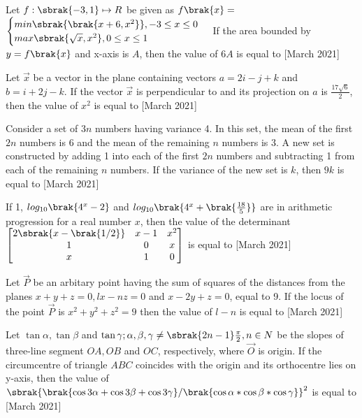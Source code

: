 \item Let $f:\sbrak{-3,1}\mapsto R$ be given as $f\brak{x}=$ $\begin{cases}
min\sbrak{\brak{x+6,x^2}}, -3\leq x \leq 0\\
max\sbrak{\sqrt{x}, x^2}, 0\leq x \leq 1
\end{cases}$
If the area bounded by $y=f\brak{x}$ and x-axis is $A$, then the value of $6A$ is equal to \hfill{[March 2021]}
\item Let $\vec{x}$ be a vector in the plane containing vectors $a=2i-j+k$ and $b=i+2j-k$. If the vector $\vec{x}$ is perpendicular to  and its projection on $a$ is $\frac{17\sqrt{6}}{2}$, then the value of $x^2$ is equal to \hfill{[March 2021]}
\item Consider a set of $3n$ numbers having variance 4. In this set, the mean of the first $2n$ numbers is 6 and the mean of the remaining $n$ numbers is 3. A new set is constructed by adding 1 into each of the first $2n$ numbers and subtracting 1 from each of the remaining $n$ numbers. If the variance of the new set is $k$, then $9k$ is equal to \hfill{[March 2021]}
\item If 1, $log_{10}\brak{4^x-2}$ and $log_{10}\brak{4^x+\brak{\frac{18}{5}}}$ are in arithmetic progression for a real number $x$, then the value of the determinant $\begin{bmatrix}2\sbrak{x-\brak{1/2}}& x-1 & x^2 \\ 1 & 0 & x \\ x & 1 & 0\end{bmatrix}$ is equal to \hfill{[March 2021]}
\item Let $\vec{P}$ be an arbitary point having the sum of squares of the distances from the planes $x+y+z=0, lx-nz=0$ and $x-2y+z=0$, equal to 9. If the locus of the point $\vec{P}$ is $x^2+y^2+z^2=9$ then the value of $l-n$ is equal to \hfill{[March 2021]}
\item Let $\tan \alpha, \tan \beta$ and $\tan \gamma;\alpha,\beta,\gamma\neq\sbrak{2n-1}\frac{\pi}{2},n\in N$ be the slopes of three-line segment $OA,OB$ and $OC$, respectively, where $\vec{O}$ is origin. If the circumcentre of triangle $ABC$ coincides with the origin and its orthocentre lies on y-axis, then the value of $\sbrak{\brak{\cos 3\alpha +\cos 3\beta +\cos 3\gamma}/\brak{\cos \alpha *\cos \beta *\cos \gamma}}^2$ is equal to \hfill{[March 2021]}
